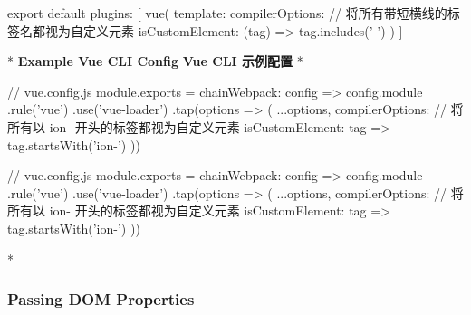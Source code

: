 \begin{paracol}{2}
\begin{codeJs}
export default {
  plugins: [
    vue({
      template: {
        compilerOptions: {
          // 将所有带短横线的标签名都视为自定义元素
          isCustomElement: (tag) => tag.includes('-')
        }
      }
    })
  ]
}
\end{codeJs}
\switchcolumn[0]*%
\textbf{Example Vue CLI Config}
\switchcolumn
\textbf{Vue CLI 示例配置}
\switchcolumn[0]*%
\begin{codeJs}
// vue.config.js
module.exports = {
  chainWebpack: config => {
    config.module
      .rule('vue')
      .use('vue-loader')
      .tap(options => ({
        ...options,
        compilerOptions: {
          // 将所有以 ion- 开头的标签都视为自定义元素
          isCustomElement: tag => tag.startsWith('ion-')
        }
      }))
  }
}
\end{codeJs}
\switchcolumn
\begin{codeJs}
// vue.config.js
module.exports = {
  chainWebpack: config => {
    config.module
      .rule('vue')
      .use('vue-loader')
      .tap(options => ({
        ...options,
        compilerOptions: {
          // 将所有以 ion- 开头的标签都视为自定义元素
          isCustomElement: tag => tag.startsWith('ion-')
        }
      }))
  }
}
\end{codeJs}
\switchcolumn[0]*%
\subsubsection{Passing DOM Properties}
\switchcolumn

\end{paracol}
